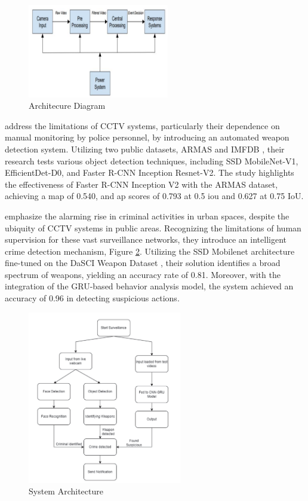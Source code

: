 \begin{figure}[h]
    \centering 
    \includegraphics[width=0.55\textwidth]{figs/Gawade-architecture.png} 
    \caption{\citet{rfc6} Architecure Diagram}
    \label{fig:gawade-architecture}
\end{figure}

\citet{rfc20} address the limitations of CCTV systems, particularly their dependence on manual monitoring by police personnel, by introducing an automated weapon detection system. Utilizing two public datasets, ARMAS and IMFDB \cite{rfc28}, their research tests various object detection techniques, including SSD MobileNet-V1, EfficientDet-D0, and Faster R-CNN Inception Resnet-V2. The study highlights the effectiveness of Faster R-CNN Inception V2 with the ARMAS dataset, achieving a \ac{map} of 0.540, and \ac{ap} scores of 0.793 at 0.5 \ac{iou} and 0.627 at 0.75 IoU.

\citet{rfc7} emphasize the alarming rise in criminal activities in urban spaces, despite the ubiquity of CCTV systems in public areas. Recognizing the limitations of human supervision for these vast surveillance networks, they introduce an intelligent crime detection mechanism, Figure \ref{fig:shenoy-architecture}. Utilizing the SSD Mobilenet architecture fine-tuned on the DaSCI Weapon Dataset \cite{rfc29}, their solution identifies a broad spectrum of weapons, yielding an accuracy rate of 0.81. Moreover, with the integration of the GRU-based behavior analysis model, the system achieved an accuracy of 0.96 in detecting suspicious actions.

\begin{figure}[h]
    \centering 
    \includegraphics[width=0.6\textwidth]{figs/shenoy-architecture.png} 
    \caption{\citet{rfc7} System Architecture}
    \label{fig:shenoy-architecture}
\end{figure}

